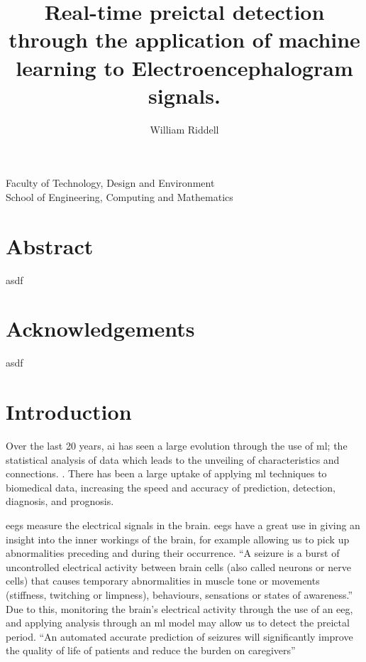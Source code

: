 \documentclass[12pt]{article}
\title{Real-time preictal detection through the application of machine learning to Electroencephalogram signals.}
\author{William Riddell}
\date{\parbox{\linewidth}{\centering
\vspace{0.5cm}
\today\endgraf\bigskip\vspace{0.5cm} 
Word Count: 10,000 \\ \vspace{0.5cm}  
Supervised by Kashinath Basu}}
\begin{document}
%
\maketitle

\vfill 
\begin{center} 
Faculty of Technology, Design and Environment\\
School of Engineering, Computing and Mathematics
\end{center}
\pagebreak
\tableofcontents
\printglossary[type=\acronymtype]
\pagebreak


\section{Abstract}

asdf









\section{Acknowledgements}

asdf








\section{Introduction}


Over the last 20 years, \acrfull{ai} has seen a large evolution through the use of \acrfull{ml}; the statistical analysis of data which leads to the unveiling of characteristics and connections. \cite{awad2015efficient}. There has been a large uptake of applying \acrshort{ml} techniques to biomedical data, increasing the speed and accuracy of prediction, detection, diagnosis, and prognosis. 

\acrfull{eegs} measure the electrical signals in the brain. \acrshort{eegs} have a great use in giving an insight into the inner workings of the brain, for example allowing us to pick up abnormalities preceding and during their occurrence. ``A seizure is a burst of uncontrolled electrical activity between brain cells (also called neurons or nerve cells) that causes temporary abnormalities in muscle tone or movements (stiffness, twitching or limpness), behaviours, sensations or states of awareness.'' \cite{johnHopkinsTypesOfSeizures} Due to this, monitoring the brain's electrical activity through the use of an \acrshort{eeg}, and applying analysis through an \acrshort{ml} model may allow us to detect the preictal period. ``An automated accurate prediction of seizures will significantly improve the quality of life of patients and reduce the burden on caregivers'' \cite{acharya2018automated}
\end{document}
